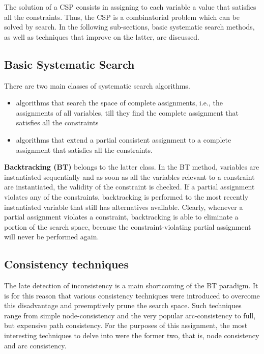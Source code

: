 The solution of a CSP consists in assigning to each variable a value that satisfies all the constraints. Thus, the CSP is a combinatorial problem which can be solved by search. In the following sub-sections, basic systematic search methods, as well as techniques that improve on the latter, are discussed.

\subsection{Basic Systematic Search}

There are two main classes of systematic search algorithms.

\begin{itemize}
    \item algorithms that search the space of complete assignments, i.e., the assignments of all variables, till they find the complete assignment that satisfies all the constraints
    \item algorithms that extend a partial consistent assignment to a complete assignment that satisfies all the constraints.
\end{itemize}

\textbf{Backtracking (BT)} belongs to the latter class. In the BT method, variables are instantiated sequentially and as soon as all the variables relevant to a constraint are instantiated, the validity of the constraint is checked. If a partial assignment violates any of the constraints, backtracking is performed to the most recently instantiated variable that still has alternatives available. Clearly, whenever a partial assignment violates a constraint, backtracking is able to eliminate a portion of the search space, because the constraint-violating partial assignment will never be performed again.

\subsection{Consistency techniques}

The late detection of inconsistency is a main shortcoming of the BT paradigm. It is for this reason that various consistency techniques were introduced to overcome this disadvantage and preemptively prune the search space. Such techniques range from simple node-consistency and the very popular arc-consistency to full, but expensive path consistency.
For the purposes of this assignment, the most interesting techniques to delve into were the former two, that is, node consistency and arc consistency.

